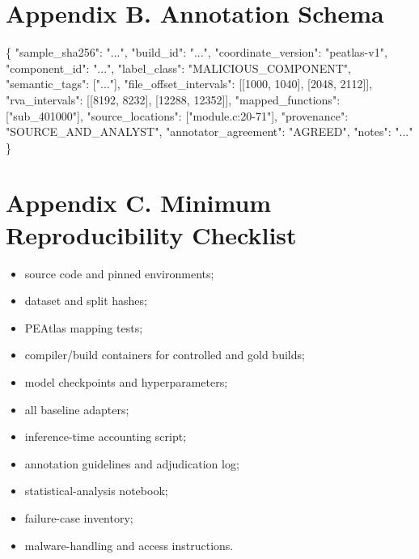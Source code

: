 \documentclass[
  10pt,
]{article}
\newenvironment{Shaded}{}{}
\newcommand{\DataTypeTok}[1]{\textcolor[rgb]{0.56,0.13,0.00}{#1}}
\newcommand{\DecValTok}[1]{\textcolor[rgb]{0.25,0.63,0.44}{#1}}
\newcommand{\FunctionTok}[1]{\textcolor[rgb]{0.02,0.16,0.49}{#1}}
\newcommand{\OtherTok}[1]{\textcolor[rgb]{0.00,0.44,0.13}{#1}}
\newcommand{\StringTok}[1]{\textcolor[rgb]{0.25,0.44,0.63}{#1}}
\providecommand{\tightlist}{%
  \setlength{\itemsep}{0pt}\setlength{\parskip}{0pt}}
\begin{document}
\section{Appendix B. Annotation
Schema}\label{appendix-b.-annotation-schema}

\begin{Shaded}
\begin{Highlighting}[]
\FunctionTok{\{}
  \DataTypeTok{"sample\_sha256"}\FunctionTok{:} \StringTok{"..."}\FunctionTok{,}
  \DataTypeTok{"build\_id"}\FunctionTok{:} \StringTok{"..."}\FunctionTok{,}
  \DataTypeTok{"coordinate\_version"}\FunctionTok{:} \StringTok{"peatlas{-}v1"}\FunctionTok{,}
  \DataTypeTok{"component\_id"}\FunctionTok{:} \StringTok{"..."}\FunctionTok{,}
  \DataTypeTok{"label\_class"}\FunctionTok{:} \StringTok{"MALICIOUS\_COMPONENT"}\FunctionTok{,}
  \DataTypeTok{"semantic\_tags"}\FunctionTok{:} \OtherTok{[}\StringTok{"..."}\OtherTok{]}\FunctionTok{,}
  \DataTypeTok{"file\_offset\_intervals"}\FunctionTok{:} \OtherTok{[[}\DecValTok{1000}\OtherTok{,} \DecValTok{1040}\OtherTok{],} \OtherTok{[}\DecValTok{2048}\OtherTok{,} \DecValTok{2112}\OtherTok{]]}\FunctionTok{,}
  \DataTypeTok{"rva\_intervals"}\FunctionTok{:} \OtherTok{[[}\DecValTok{8192}\OtherTok{,} \DecValTok{8232}\OtherTok{],} \OtherTok{[}\DecValTok{12288}\OtherTok{,} \DecValTok{12352}\OtherTok{]]}\FunctionTok{,}
  \DataTypeTok{"mapped\_functions"}\FunctionTok{:} \OtherTok{[}\StringTok{"sub\_401000"}\OtherTok{]}\FunctionTok{,}
  \DataTypeTok{"source\_locations"}\FunctionTok{:} \OtherTok{[}\StringTok{"module.c:20{-}71"}\OtherTok{]}\FunctionTok{,}
  \DataTypeTok{"provenance"}\FunctionTok{:} \StringTok{"SOURCE\_AND\_ANALYST"}\FunctionTok{,}
  \DataTypeTok{"annotator\_agreement"}\FunctionTok{:} \StringTok{"AGREED"}\FunctionTok{,}
  \DataTypeTok{"notes"}\FunctionTok{:} \StringTok{"..."}
\FunctionTok{\}}
\end{Highlighting}
\end{Shaded}

\section{Appendix C. Minimum Reproducibility
Checklist}\label{appendix-c.-minimum-reproducibility-checklist}

\begin{itemize}
\tightlist
\item
  source code and pinned environments;
\item
  dataset and split hashes;
\item
  PEAtlas mapping tests;
\item
  compiler/build containers for controlled and gold builds;
\item
  model checkpoints and hyperparameters;
\item
  all baseline adapters;
\item
  inference-time accounting script;
\item
  annotation guidelines and adjudication log;
\item
  statistical-analysis notebook;
\item
  failure-case inventory;
\item
  malware-handling and access instructions.
\end{itemize}
\end{document}
